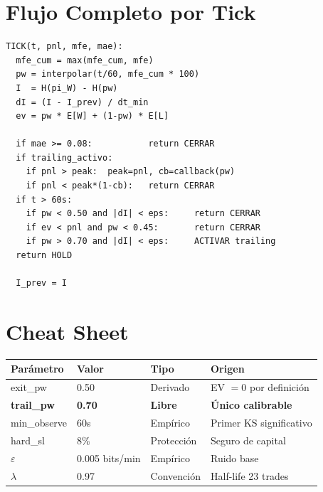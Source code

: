 \documentclass[11pt,a4paper]{article}
\begin{document}
\section{Flujo Completo por Tick}

\begin{tcolorbox}[key, title=Pseudoc\'odigo]
\begin{verbatim}
TICK(t, pnl, mfe, mae):
  mfe_cum = max(mfe_cum, mfe)
  pw = interpolar(t/60, mfe_cum * 100)
  I  = H(pi_W) - H(pw)
  dI = (I - I_prev) / dt_min
  ev = pw * E[W] + (1-pw) * E[L]

  if mae >= 0.08:           return CERRAR
  if trailing_activo:
    if pnl > peak:  peak=pnl, cb=callback(pw)
    if pnl < peak*(1-cb):   return CERRAR
  if t > 60s:
    if pw < 0.50 and |dI| < eps:     return CERRAR
    if ev < pnl and pw < 0.45:       return CERRAR
    if pw > 0.70 and |dI| < eps:     ACTIVAR trailing
  return HOLD

  I_prev = I
\end{verbatim}
\end{tcolorbox}

\section{Cheat Sheet}

\begin{tcolorbox}[key, title=Resumen de par\'ametros]
\renewcommand{\arraystretch}{1.4}
\begin{tabular}{llll}
\toprule
\textbf{Par\'ametro} & \textbf{Valor} & \textbf{Tipo} & \textbf{Origen} \\
\midrule
exit\_pw & 0.50 & Derivado & EV $= 0$ por definici\'on \\
\textbf{trail\_pw} & \textbf{0.70} & \textbf{Libre} & \textbf{\'Unico calibrable} \\
min\_observe & 60s & Emp\'irico & Primer KS significativo \\
hard\_sl & 8\% & Protecci\'on & Seguro de capital \\
$\varepsilon$ & 0.005 bits/min & Emp\'irico & Ruido base \\
$\lambda$ & 0.97 & Convenci\'on & Half-life 23 trades \\
\bottomrule
\end{tabular}
\end{tcolorbox}
\end{document}
